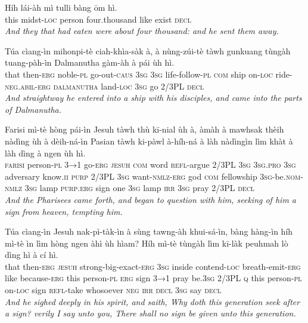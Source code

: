 \documentclass[11pt,a4paper]{article}
\begin{document}
\begin{exe}
\gll Híh lái-àh mì tulli bàng ōm hì. \\
     this midst-\textsc{loc} person four.thousand like exist \textsc{decl} \\
\glt \textcolor{kjvcolor}{\textit{And they that had eaten were about four thousand: and he sent them away.}}

\gll Túa cìang-ìn mihonpi-tè ciah-khìa-sàk à, à nùng-zúi-tè tàwh gunkuang tùngàh tuang-pàh-ìn Dalmanutha gàm-àh à pái ùh hì. \\
     that then-\textsc{erg} noble-\textsc{pl} go-out-\textsc{caus} \textsc{3sg} \textsc{3sg} life-follow-\textsc{pl} \textsc{com} ship on-\textsc{loc} ride-\textsc{neg}.\textsc{abil}-\textsc{erg} \textsc{dalmanutha} land-\textsc{loc} \textsc{3sg} go 2/3PL \textsc{decl} \\
\glt \textcolor{kjvcolor}{\textit{And straightway he entered into a ship with his disciples, and came into the parts of Dalmanutha.}}

\gll Farisi mì-tè hòng pái-ìn Jesuh tàwh thù kī-nial ùh à, àmàh à mawhsak thèih nàdìng ùh à dèih-ná-ìn Pasian tàwh ki-pàwl à-híh-ná à làh nàdìngìn lìm khàt à làh dìng à ngen ùh hì. \\
     \textsc{farisi} person-\textsc{pl} \textsc{3→1} go-\textsc{erg} \textsc{jesuh} \textsc{com} word \textsc{refl}-argue 2/3PL \textsc{3sg} \textsc{3sg}.\textsc{pro} \textsc{3sg} adversary know.\textsc{ii} \textsc{purp} 2/3PL \textsc{3sg} want-\textsc{nmlz}-\textsc{erg} god \textsc{com} fellowship \textsc{3sg}-be.\textsc{nom}-\textsc{nmlz} \textsc{3sg} lamp \textsc{purp}.\textsc{erg} sign one \textsc{3sg} lamp \textsc{irr} \textsc{3sg} pray 2/3PL \textsc{decl} \\
\glt \textcolor{kjvcolor}{\textit{And the Pharisees came forth, and began to question with him, seeking of him a sign from heaven, tempting him.}}

\gll Túa cìang-ìn Jesuh nak-pì-tàk-ìn à sùng tawng-àh khui-sá-ìn, bàng hàng-ìn híh mì-tè ìn lìm hòng ngen àhì ùh hìam? Híh mì-tè tùngàh lìm kī-làk peuhmah lò dìng hì à cí hì. \\
     that then-\textsc{erg} \textsc{jesuh} strong-big-exact-\textsc{erg} \textsc{3sg} inside contend-\textsc{loc} breath-emit-\textsc{erg} like because-\textsc{erg} this person-\textsc{pl} \textsc{erg} sign \textsc{3→1} pray be.\textsc{3sg} 2/3PL \textsc{q} this person-\textsc{pl} on-\textsc{loc} sign \textsc{refl}-take whosoever \textsc{neg} \textsc{irr} \textsc{decl} \textsc{3sg} say \textsc{decl} \\
\glt \textcolor{kjvcolor}{\textit{And he sighed deeply in his spirit, and saith, Why doth this generation seek after a sign? verily I say unto you, There shall no sign be given unto this generation.}}


\end{exe}
\end{document}
